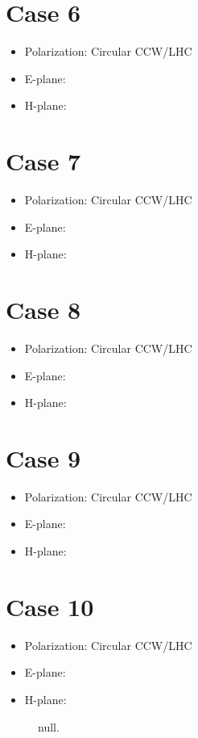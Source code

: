 \documentclass[12pt,a4paper]{article}
\begin{document}
\section{Case 6}\label{sec:6}
\begin{itemize}
\item Polarization: Circular CCW/LHC
\item E-plane: 
\item H-plane: 
\end{itemize}
\section{Case 7}\label{sec:7}
\begin{itemize}
\item Polarization: Circular CCW/LHC
\item E-plane: 
\item H-plane: 
\end{itemize}
\section{Case 8}\label{sec:8}
\begin{itemize}
\item Polarization: Circular CCW/LHC
\item E-plane: 
\item H-plane: 
\end{itemize}
\section{Case 9}\label{sec:9}
\begin{itemize}
\item Polarization: Circular CCW/LHC
\item E-plane: 
\item H-plane: 
\end{itemize}
\section{Case 10}\label{sec:10}
\begin{itemize}
\item Polarization: Circular CCW/LHC
\item E-plane: 
\item H-plane: 
\end{itemize}

\begin{figure}[h]
  \centering
  \noindent\makebox[\textwidth]{\scalebox{0.90}{}}
  \caption{null.}
  \label{fig:null}
\end{figure}
\end{document}
